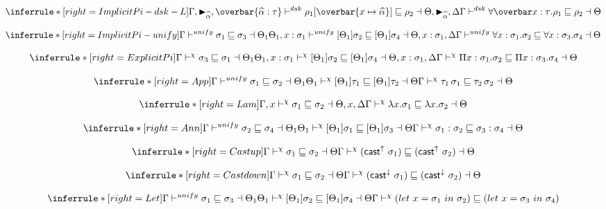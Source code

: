 \[
\inferrule*[right=ImplicitPi-dsk-L]
{\Gamma , \blacktriangleright_{\genA}, \overbar{\genA : \tau} \dsk \rho_1[\overbar{\tpmapsto \tau x {\genA}}] \sqsubseteq \rho_2 \dashv \Theta, \blacktriangleright_{\genA}, \Delta}
{\Gamma \dsk \forallvars{x:\tau}.\rho_1 \sqsubseteq \rho_2 \dashv \Theta}
\]

\[
\inferrule*[right=ImplicitPi-unify]
{\Gamma \unify  \sigma_1 \sqsubseteq \sigma_3 \dashv \Theta_1 \\
\Theta_1, x:\sigma_1 \unify [\Theta_1]\sigma_2 \sqsubseteq [\Theta_1]\sigma_4 \dashv \Theta, x:\sigma_1, \Delta}
{ \Gamma \unify \forall x:\sigma_1. \sigma_2 \sqsubseteq \forall x:\sigma_3. \sigma_4 \dashv \Theta}
\]

\[
\inferrule*[right=ExplicitPi]
{\Gamma \dskunify  \sigma_3 \sqsubseteq \sigma_1 \dashv \Theta_1 \\
\Theta_1, x:\sigma_1 \dskunify [\Theta_1]\sigma_2 \sqsubseteq [\Theta_1]\sigma_4 \dashv \Theta, x:\sigma_1, \Delta}
{ \Gamma \dskunify \Pi x:\sigma_1. \sigma_2 \sqsubseteq \Pi x:\sigma_3. \sigma_4 \dashv \Theta}
\]

\[
\inferrule*[right=App]
{
\Gamma \unify \sigma_1 \sqsubseteq \sigma_2 \dashv \Theta_1 \\
\Theta_1 \dskunify [\Theta_1]\tau_1 \sqsubseteq [\Theta_1]\tau_2 \dashv \Theta
}
{\Gamma \dskunify \tau_1\, \sigma_1 \sqsubseteq \tau_2\, \sigma_2 \dashv \Theta}
\]

\[
\inferrule*[right=Lam]
{
\Gamma, x \dskunify \sigma_1 \sqsubseteq \sigma_2 \dashv \Theta, x, \Delta}
{\Gamma \dskunify \lambda x. \sigma_1 \sqsubseteq \lambda x. \sigma_2 \dashv \Theta }
\]

\[
\inferrule*[right=Ann]
{
\Gamma \unify \sigma_2 \sqsubseteq \sigma_4 \dashv \Theta_1 \\
\Theta_1 \dskunify  [\Theta_1]\sigma_1 \sqsubseteq [\Theta_1]\sigma_3 \dashv \Theta }
{\Gamma \dskunify \sigma_1:\sigma_2 \sqsubseteq \sigma_3:\sigma_4 \dashv \Theta}
\]

\[
\inferrule*[right=Castup]
{
\Gamma \dskunify  \sigma_1 \sqsubseteq \sigma_2 \dashv \Theta}
{\Gamma \dskunify (\castupe \sigma_1) \sqsubseteq  (\castupe \sigma_2) \dashv \Theta}
\]

\[
\inferrule*[right=Castdown]
{
\Gamma \dskunify  \sigma_1 \sqsubseteq \sigma_2 \dashv \Theta}
{\Gamma \dskunify  (\castdowne \sigma_1) \sqsubseteq  (\castdowne \sigma_2) \dashv \Theta}
\]

\[
\inferrule*[right=Let]
{
\Gamma \unify \sigma_1 \sqsubseteq \sigma_3 \dashv \Theta_1 \\
\Theta_1 \dskunify  [\Theta_1]\sigma_2 \sqsubseteq [\Theta_1]\sigma_4 \dashv \Theta }
{\Gamma \dskunify  (let\ x = \sigma_1\ in\ \sigma_2) \sqsubseteq  (let\ x = \sigma_3\ in\ \sigma_4) }
\]

